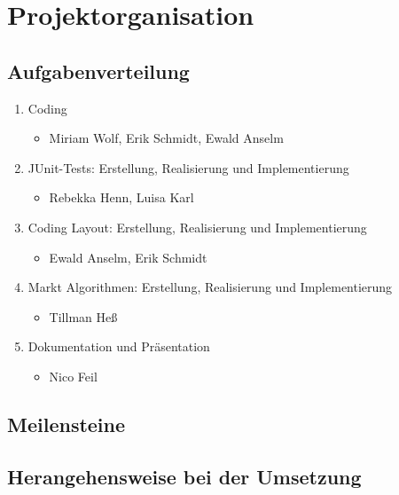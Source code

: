 \clearpage
\chapter{Projektorganisation}
\section{Aufgabenverteilung}
\begin{enumerate}
	\item Coding
	\begin{itemize}
		\item Miriam Wolf, Erik Schmidt, Ewald Anselm
	\end{itemize} 
	\item JUnit-Tests: Erstellung, Realisierung und Implementierung
	\begin{itemize}
		\item Rebekka Henn, Luisa Karl
	\end{itemize} 
	\item Coding Layout: Erstellung, Realisierung und Implementierung
	\begin{itemize}
		\item Ewald Anselm, Erik Schmidt
	\end{itemize} 
	\item Markt Algorithmen: Erstellung, Realisierung und Implementierung
	\begin{itemize}
		\item Tillman Heß
	\end{itemize} 	
	\item Dokumentation und Präsentation
	\begin{itemize}
	\item Nico Feil
	\end{itemize}
\end{enumerate}
\section{Meilensteine}
\section{Herangehensweise bei der Umsetzung}